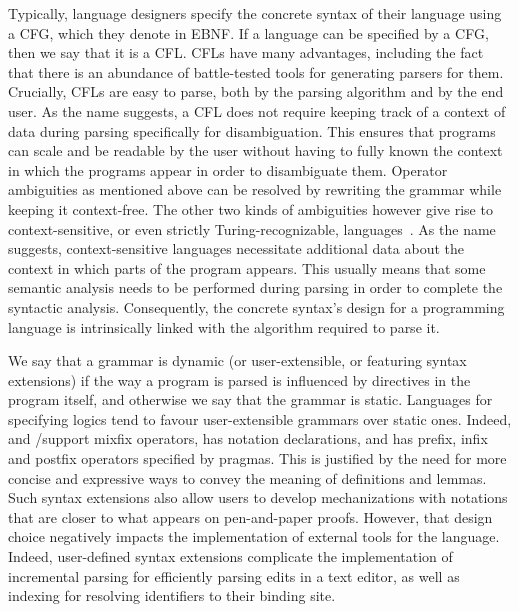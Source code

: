 
Typically, language designers specify the concrete syntax of their language using a \ac{CFG}, which they denote in \ac{EBNF}.
If a language can be specified by a \ac{CFG}, then we say that it is a \ac{CFL}.
\Acp{CFL} have many advantages, including the fact that there is an abundance of battle-tested tools for generating parsers for them.
Crucially, \acp{CFL} are easy to parse, both by the parsing algorithm and by the end user.
As the name suggests, a \ac{CFL} does not require keeping track of a context of data during parsing specifically for disambiguation.
This ensures that programs can scale and be readable by the user without having to fully known the context in which the programs appear in order to disambiguate them.
Operator ambiguities as mentioned above can be resolved by rewriting the grammar while keeping it context-free.
The other two kinds of ambiguities however give rise to context-sensitive, or even strictly Turing-recognizable, languages~\cite{chomsky1956three}.
As the name suggests, context-sensitive languages necessitate additional data about the context in which parts of the program appears.
This usually means that some semantic analysis needs to be performed during parsing in order to complete the syntactic analysis.
Consequently, the concrete syntax's design for a programming language is intrinsically linked with the algorithm required to parse it.


We say that a grammar is dynamic (or user-extensible, or featuring syntax extensions) if the way a program is parsed is influenced by directives in the program itself, and otherwise we say that the grammar is static.
Languages for specifying logics tend to favour user-extensible grammars over static ones.
Indeed, \Agda and \Isabelle/\HOL support mixfix operators, \Coq has notation declarations, and \Beluga has prefix, infix and postfix operators specified by pragmas.
This is justified by the need for more concise and expressive ways to convey the meaning of definitions and lemmas.
Such syntax extensions also allow users to develop mechanizations with notations that are closer to what appears on pen-and-paper proofs.
However, that design choice negatively impacts the implementation of external tools for the language.
Indeed, user-defined syntax extensions complicate the implementation of incremental parsing for efficiently parsing edits in a text editor, as well as indexing for resolving identifiers to their binding site.

